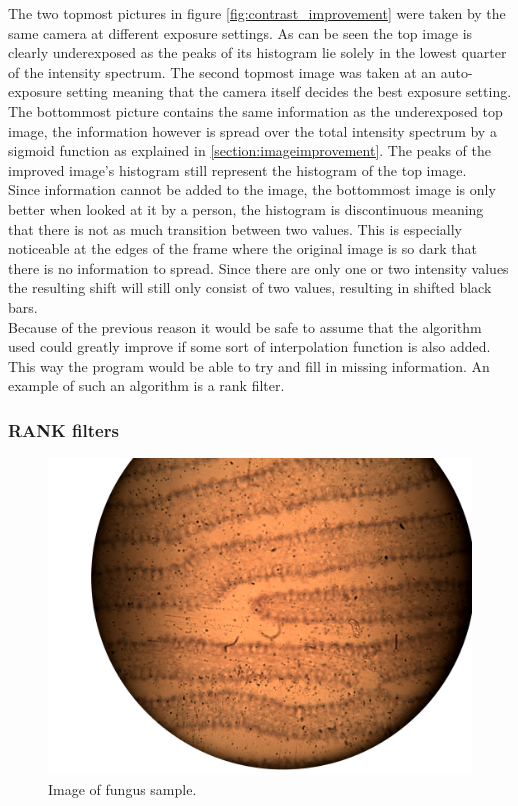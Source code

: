 The two topmost pictures in figure \ref{fig:contrast_improvement} were taken by the same camera at different exposure settings. As can be seen the top image is clearly underexposed as the peaks of its histogram lie solely in the lowest quarter of the intensity spectrum. The second topmost image was taken at an auto-exposure setting meaning that the camera itself decides the best exposure setting. The bottommost picture contains the same information as the underexposed top image, the information however is spread over the total intensity spectrum by a sigmoid function as explained in \ref{section:imageimprovement}. The peaks of the improved image's histogram still represent the histogram of the top image.\\
Since information cannot be added to the image, the bottommost image is only better when looked at it by a person, the histogram is discontinuous meaning that there is not as much transition between two values. This is especially noticeable at the edges of the frame where the original image is so dark that there is no information to spread. Since there are only one or two intensity values the resulting shift will still only consist of two values, resulting in shifted black bars.\\
Because of the previous reason it would be safe to assume that the algorithm used could greatly improve if some sort of interpolation function is also added. This way the program would be able to try and fill in missing information. An example of such an algorithm is a rank filter.\\

\subsubsection{RANK filters}
\begin{figure}
    \includegraphics[width=1\linewidth, frame, keepaspectratio]{afbeeldingen/fungus.png}
  	\caption{Image of fungus sample.}
  	\label{fig_fungus}
\end{figure}

